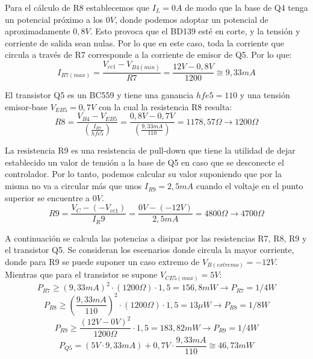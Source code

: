 Para el cálculo de R8 establecemos que $I_L=0A$ de modo que la base de Q4 tenga un potencial próximo a los $0V$, donde podemos adoptar un potencial de aproximadamente $0,8V$. Esto provoca que el BD139 esté en corte, y la tensión y corriente de salida sean nulas. Por lo que en este caso, toda la corriente que circula a través de R7 corresponde a la corriente de emisor de Q5. Por lo que:
\begin{equation}
I_{R7(max)}=\frac{V_{cc1}-V_{B4(min)}}{R7}=\frac{12V-0,8V}{1200}\cong 9,33 mA
\end{equation} \par 
El transistor Q5 es un BC559 y tiene una ganancia $hfe5=110$ y una tensión emisor-base $V_{EB5}=0,7V$ con la cual la resistencia R8 resulta:
\begin{equation}
R8=\frac{V_{B4}-V_{EB5}}{(\frac{I_{R7}}{hfe5})}=\frac{0,8V-0,7V}{(\frac{9,33 mA}{110})}=1178,57\Omega \to 1200\Omega
\end{equation}\par 

La resistencia R9 es una resistencia de pull-down que tiene la utilidad de dejar establecido un valor de tensión a la base de Q5 en caso que se desconecte el controlador. Por lo tanto, podemos calcular su valor suponiendo que por la misma no va a circular más que unos $I_{R9}=2,5 mA$ cuando el voltaje en el punto superior se encuentre a $0V$.
\begin{equation}
R9=\frac{V_C-(-V_{cc1})}{I_R9}=\frac{0V-(-12V)}{2,5 mA}=4800\Omega \to 4700\Omega 
\end{equation}\par 

A continuación se calcula las potencias a disipar por las resistencias R7, R8, R9 y el transistor Q5. Se consideran los escenarios donde circula la mayor corriente, donde para R9 se puede suponer un caso extremo de $V_{B(extremo)}=-12V$. Mientras que para el transistor se supone $V_{CE5(max)}=5V$:
\begin{equation}
P_{R7}\geq (9,33mA)^2\cdot (1200\Omega )\cdot 1,5=156,8 mW	\to P_{R7}=1/4W
\end{equation}
\begin{equation}
P_{R8}\geq (\frac{9,33mA}{110})^2\cdot (1200\Omega )\cdot 1,5= 13\mu W \to P_{R8}=1/8W
\end{equation}
\begin{equation}
P_{R9}\geq \frac{(12V-0V)^2}{1200\Omega}\cdot 1,5=183,82 mW	\to 	P_{R9}=1/4W
\end{equation}
\begin{equation}
P_{Q5}=(5V\cdot 9,33mA)+0,7V\cdot \frac{9,33mA}{110}\cong 46,73mW
\end{equation}\par 

